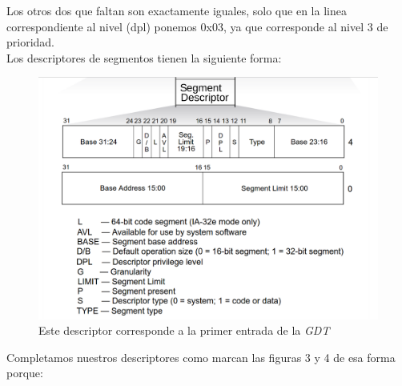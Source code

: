 Los otros dos que faltan son exactamente iguales, solo que en la linea correspondiente al nivel (dpl) ponemos 0x03, ya que corresponde al nivel 3 de prioridad.\\

Los descriptores de segmentos tienen la siguiente forma:
\\

\begin{figure}[H]
\begin{center}
  \includegraphics[width=\linewidth]{ejercicio1/estructuradescriptor.png}
  \caption{{\small Este descriptor corresponde a la primer entrada de la \textit{GDT}}} 
\endminipage
\end{center}
\end{figure}

Completamos nuestros descriptores como marcan las figuras 3 y 4 de esa forma porque:

